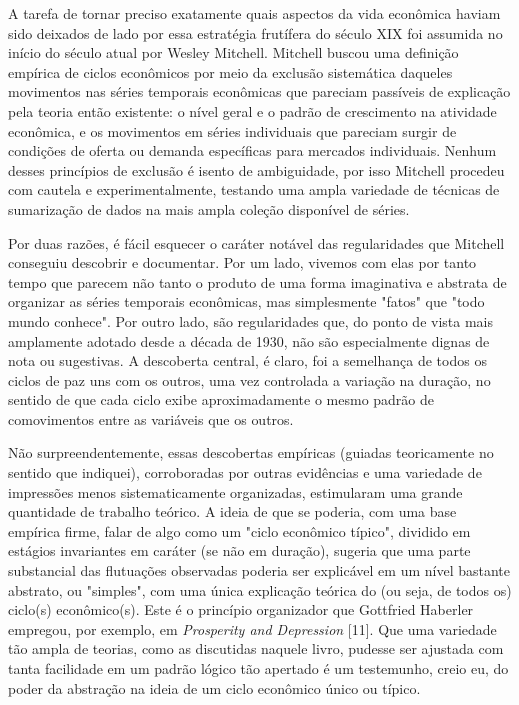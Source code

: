 \documentclass[12pt]{article}
\begin{document}
A tarefa de tornar preciso exatamente quais aspectos da vida econômica haviam sido deixados de lado por essa estratégia frutífera do século XIX foi assumida no início do século atual por Wesley Mitchell. Mitchell buscou uma definição empírica de ciclos econômicos por meio da exclusão sistemática daqueles movimentos nas séries temporais econômicas que pareciam passíveis de explicação pela teoria então existente: o nível geral e o padrão de crescimento na atividade econômica, e os movimentos em séries individuais que pareciam surgir de condições de oferta ou demanda específicas para mercados individuais. Nenhum desses princípios de exclusão é isento de ambiguidade, por isso Mitchell procedeu com cautela e experimentalmente, testando uma ampla variedade de técnicas de sumarização de dados na mais ampla coleção disponível de séries.

Por duas razões, é fácil esquecer o caráter notável das regularidades que Mitchell conseguiu descobrir e documentar. Por um lado, vivemos com elas por tanto tempo que parecem não tanto o produto de uma forma imaginativa e abstrata de organizar as séries temporais econômicas, mas simplesmente "fatos" que "todo mundo conhece". Por outro lado, são regularidades que, do ponto de vista mais amplamente adotado desde a década de 1930, não são especialmente dignas de nota ou sugestivas. A descoberta central, é claro, foi a semelhança de todos os ciclos de paz uns com os outros, uma vez controlada a variação na duração, no sentido de que cada ciclo exibe aproximadamente o mesmo padrão de comovimentos entre as variáveis que os outros.

Não surpreendentemente, essas descobertas empíricas (guiadas teoricamente no sentido que indiquei), corroboradas por outras evidências e uma variedade de impressões menos sistematicamente organizadas, estimularam uma grande quantidade de trabalho teórico. A ideia de que se poderia, com uma base empírica firme, falar de algo como um "ciclo econômico típico", dividido em estágios invariantes em caráter (se não em duração), sugeria que uma parte substancial das flutuações observadas poderia ser explicável em um nível bastante abstrato, ou "simples", com uma única explicação teórica do (ou seja, de todos os) ciclo(s) econômico(s). Este é o princípio organizador que Gottfried Haberler empregou, por exemplo, em \textit{Prosperity and Depression} [11]. Que uma variedade tão ampla de teorias, como as discutidas naquele livro, pudesse ser ajustada com tanta facilidade em um padrão lógico tão apertado é um testemunho, creio eu, do poder da abstração na ideia de um ciclo econômico único ou típico.
\end{document}
